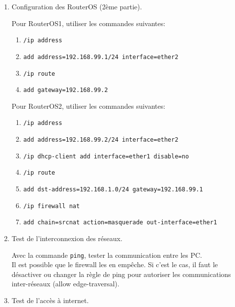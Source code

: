 \documentclass[a4paper]{article}
\begin{document}
\begin{itemize}
\begin{enumerate}
    \item Configuration des RouterOS (2ème partie).
    \begin{example}
        Pour RouterOS1, utiliser les commandes suivantes:
        \begin{enumerate}
            \item \texttt{/ip address}
            \item \texttt{add address=192.168.99.1/24 interface=ether2}
            \item \texttt{/ip route}
            \item \texttt{add gateway=192.168.99.2}
        \end{enumerate}
        Pour RouterOS2, utiliser les commandes suivantes:
        \begin{enumerate}
            \item \texttt{/ip address}
            \item \texttt{add address=192.168.99.2/24 interface=ether2}
            \item \texttt{/ip dhcp-client add interface=ether1 disable=no}
            \item \texttt{/ip route}
            \item \texttt{add dst-address=192.168.1.0/24 gateway=192.168.99.1}
            \item \texttt{/ip firewall nat}
            \item \texttt{add chain=srcnat action=masquerade out-interface=ether1}
        \end{enumerate}
    \end{example}


    \item Test de l’interconnexion des réseaux.
    \begin{example}
        Avec la commande \texttt{ping}, tester la communication entre les PC. \\
        Il est possible que le firewall les en empêche. Si c'est le cas, il faut le désactiver ou changer la règle de ping pour autoriser les communications inter-réseaux (allow edge-traversal).
    \end{example}


    \item Test de l’accès à internet.


\end{enumerate}





\end{itemize}
\end{document}
